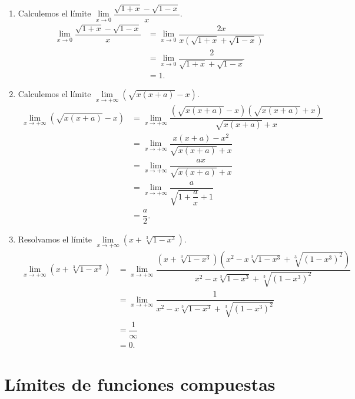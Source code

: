  \begin{example}
 	\begin{enumerate}
 		\item Calculemos el l\'imite \(\lim\limits_{x\to 0}\dfrac{\sqrt{1+x}-\sqrt{1-x}}{x}.\)
 		\begin{align*}
 		\lim\limits_{x\to 0}\dfrac{\sqrt{1+x}-\sqrt{1-x}}{x}&=\lim\limits_{x\to 0}\dfrac{2x}{x\left(\sqrt{1+x}+\sqrt{1-x}\right)}\\
 		&=\lim\limits_{x\to 0}\dfrac{2}{\sqrt{1+x}+\sqrt{1-x}}\\
 		&=1.
 		\end{align*}
 		\item Calculemos el l\'imite \(\lim\limits_{x\to+\infty}\left(\sqrt{x(x+a)}-x\right).\)
 		\begin{align*}
 		\lim\limits_{x\to+\infty}\left(\sqrt{x(x+a)}-x\right)&=\lim\limits_{x\to+\infty}\dfrac{\left(\sqrt{x(x+a)}-x\right)\left(\sqrt{x(x+a)}+x\right)}{\sqrt{x(x+a)}+x}\\
 		&=\lim\limits_{x\to+\infty}\dfrac{x(x+a)-x^2}{\sqrt{x(x+a)}+x}\\
 		&=\lim\limits_{x\to+\infty}\dfrac{ax}{\sqrt{x(x+a)}+x}\\
 		&=\lim\limits_{x\to+\infty}\dfrac{a}{\sqrt{1+\dfrac{a}{x}}+1}\\
 		&=\dfrac{a}{2}.
 		\end{align*}
 		
 		\item Resolvamos el l\'imite \(\lim\limits_{x\to+\infty}\left(x+\sqrt[3]{1-x^3}\right).\)
 		\begin{align*}
 		\lim\limits_{x\to+\infty}\left(x+\sqrt[3]{1-x^3}\right)&=\lim\limits_{x\to+\infty}\dfrac{\left(x+\sqrt[3]{1-x^3}\right)\left(x^2-x\sqrt[3]{1-x^3}+\sqrt[3]{(1-x^3)^2}\right)}{x^2-x\sqrt[3]{1-x^3}+\sqrt[3]{(1-x^3)^2}}\\
 		&=\lim\limits_{x\to+\infty}\dfrac{1}{x^2-x\sqrt[3]{1-x^3}+\sqrt[3]{(1-x^3)^2}} \\
 		&=\dfrac{1}{\infty}\\
 		&=0.
 		\end{align*}
 	\end{enumerate}
 \end{example}


\section*{L\'imites de funciones compuestas}

